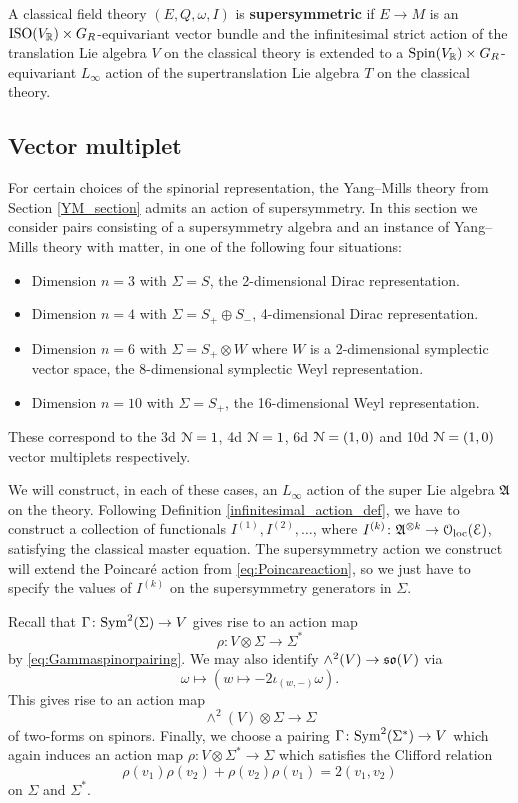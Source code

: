 \documentclass[10pt, oneside]{article}
\begin{document}
\begin{definition}
A classical field theory $(E, Q, \omega, I)$ is {\bf supersymmetric} if $E\rightarrow M$ is an $\mathrm{ISO}(V_\mathbb R)\times G_R$-equivariant vector bundle and the infinitesimal strict action of the translation Lie algebra $V$ on the classical theory is extended to a $\mathrm{Spin}(V_\mathbb R)\times G_R$-equivariant $L_\infty$ action of the supertranslation Lie algebra $T$ on the classical theory.
\end{definition}

\subsection{Vector multiplet} \label{sect:vectormultipletSUSY}

For certain choices of the spinorial representation, the Yang--Mills theory from Section \ref{YM_section} admits an action of supersymmetry. In this section we consider pairs consisting of a supersymmetry algebra and an instance of Yang--Mills theory with matter, in one of the following four situations:
\begin{itemize}
 \item Dimension $n=3$ with $\Sigma = S$, the 2-dimensional Dirac representation.
 \item Dimension $n=4$ with $\Sigma = S_+ \oplus S_-$, 4-dimensional Dirac representation.
 \item Dimension $n=6$ with $\Sigma = S_+ \otimes W$ where $W$ is a 2-dimensional symplectic vector space, the 8-dimensional symplectic Weyl representation.
 \item Dimension $n=10$ with $\Sigma = S_+$, the 16-dimensional Weyl representation.
\end{itemize}
These correspond to the 3d $\mathcal N=1$, 4d $\mathcal N=1$, 6d $\mathcal N=(1, 0)$ and 10d $\mathcal N=(1, 0)$ vector multiplets respectively.

We will construct, in each of these cases, an $L_\infty$ action of the super Lie algebra $\mathfrak{A}$ on the theory. Following Definition \ref{infinitesimal_action_def}, we have to construct a collection of functionals $I^{(1)}, I^{(2)}, \dots$, where $I^{(k)}\colon \mathfrak{A}^{\otimes k}\rightarrow \mathcal{O}_{\rm loc}(\mathcal E)$, satisfying the classical master equation. The supersymmetry action we construct will extend the Poincar\'{e} action from \eqref{eq:Poincareaction}, so we just have to specify the values of $I^{(k)}$ on the supersymmetry generators in $\Sigma$.

Recall that $\Gamma\colon{\rm Sym}^2(\Sigma)\rightarrow V$ gives rise to an action map
\[\rho\colon V\otimes \Sigma\longrightarrow \Sigma^*\]
by \eqref{eq:Gammaspinorpairing}. We may also identify $\wedge^2(V)\rightarrow \mathfrak{so}(V)$ via
\[\omega\mapsto (w\mapsto -2\iota_{(w, -)} \omega).\]
This gives rise to an action map
\[\wedge^2(V)\otimes \Sigma\longrightarrow \Sigma\]
of two-forms on spinors. Finally, we choose a pairing $\Gamma\colon {\rm Sym}^2(\Sigma^*)\rightarrow V$ which again induces an action map $\rho\colon V\otimes \Sigma^*\rightarrow \Sigma$ which satisfies the Clifford relation
\[\rho(v_1)\rho(v_2) + \rho(v_2)\rho(v_1) = 2(v_1, v_2)\]
on $\Sigma$ and $\Sigma^*$.
\end{document}

